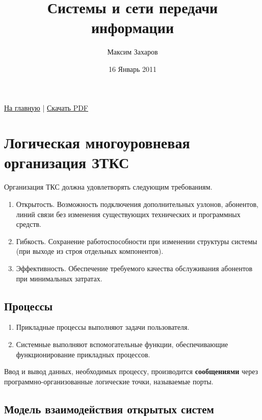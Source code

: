 \documentclass[12pt, russian, oneside, article]{ncc}
\begin{document}
\title{Системы и сети передачи информации}
\author{Максим Захаров}
\date{16 Январь 2011}
\maketitle

\setcounter{tocdepth}{3}
\tableofcontents
\vspace*{1cm}


\href{file:///home/maxim/Documents/Git/lectures/index.org}{На главную} | \href{file:///home/maxim/Documents/Git/lectures/other/SiSPI_Lectures.pdf}{Скачать PDF}

\section{Логическая многоуровневая организация ЗТКС}
\label{sec-1}


Организация ТКС должна удовлетворять следующим требованиям.
\begin{enumerate}
\item Открытость. Возможность подключения дополнительных узлонов, абонентов, линий связи без изменения существующих технических и программных средств.
\item Гибкость. Сохранение работоспособности при изменении структуры системы (при выходе из строя отдельных компонентов).
\item Эффективность. Обеспечение требуемого качества обслуживания абонентов при минимальных затратах.
\end{enumerate}
  
\subsection{Процессы}
\label{sec-1_1}


\begin{enumerate}
\item Прикладные процессы выполняют задачи пользователя.
\item Системные выполняют вспомогательные функции, обеспечивающие функционирование прикладных процессов.
\end{enumerate}

Ввод и вывод данных, необходимых процессу, производится \textbf{сообщениями} через программно-организованные логические точки, называемые порты.
\subsection{Модель взаимодействия открытых систем}
\label{sec-1_2}
\end{document}
